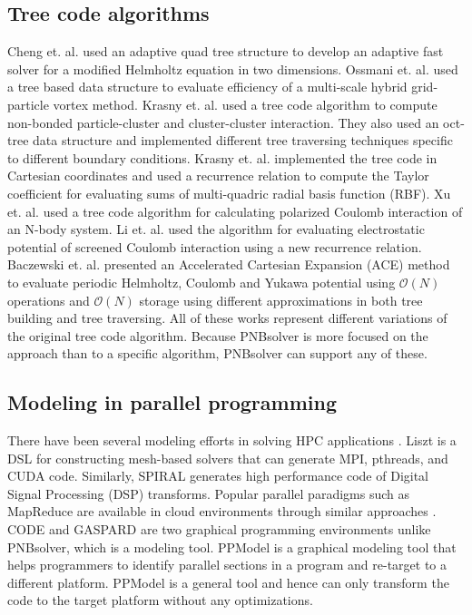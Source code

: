 \documentclass[draftclsnofoot]{elsarticle}
\begin{document}
\subsection{Tree code algorithms}
Cheng et. al. \cite{cheng} used an adaptive quad tree structure to develop an adaptive fast solver for a modified Helmholtz equation in
two dimensions. Ossmani et. al. \cite{ossmani} used a tree based data structure to evaluate efficiency of a multi-scale hybrid 
grid-particle vortex method. Krasny et. al.  \cite{krasny1} used a tree code algorithm to compute non-bonded particle-cluster and 
cluster-cluster interaction. They also used an oct-tree data structure and implemented different tree traversing techniques specific to different 
boundary conditions. Krasny et. al. \cite{krasny2} implemented the tree code in Cartesian coordinates and used a recurrence relation 
to compute the Taylor coefficient for evaluating sums of multi-quadric radial basis function (RBF). Xu et. al. \cite{xu} used a tree code 
algorithm for calculating polarized Coulomb interaction of an N-body system. Li et. al. \cite{li} used the algorithm
for evaluating electrostatic potential of screened Coulomb interaction using a new recurrence relation. 
Baczewski et. al. \cite{baczewski} presented an Accelerated Cartesian Expansion (ACE) method to evaluate periodic 
Helmholtz, Coulomb and Yukawa potential using $\mathcal{O}(N)$ operations and $\mathcal{O}(N)$ storage using different approximations in
both tree building and tree traversing. All of these works represent different variations of the original tree code algorithm.
Because PNBsolver is more focused on the approach than to a specific algorithm, PNBsolver can support any of these. 

\subsection{Modeling in parallel programming}
There have been several modeling efforts in solving HPC applications \cite{rithu1,rithu2}. Liszt \cite{liszt} is a DSL for constructing mesh-based solvers that 
can generate MPI, pthreads, and CUDA code. Similarly, SPIRAL \cite{spiral} generates high performance code of Digital Signal Processing (DSP) transforms. 
Popular parallel paradigms such as MapReduce are available in cloud environments through similar approaches \cite{mapredoop}.
CODE \cite{code} and GASPARD \cite{gaspard} are two graphical programming environments unlike PNBsolver, which is a modeling tool. 
PPModel \cite{sc11,acmse} is a graphical modeling tool that helps programmers to identify parallel sections in a program and re-target to a different 
platform.  PPModel is a general tool and hence can only transform the code to the target platform without any optimizations.
\end{document}
